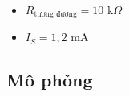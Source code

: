 \begin{dapsobox}
  \begin{itemize}[leftmargin=1.5em]
    \item $R_{\text{tương đương}} = 10\text{ k}\Omega$
    \item $I_S = 1{,}2\text{ mA}$
  \end{itemize}
\end{dapsobox}

\subsection{Mô phỏng}
\simresult
{}
